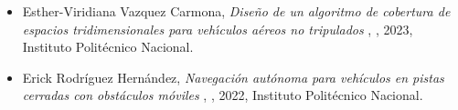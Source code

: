 \begin{itemize} 
\item Esther-Viridiana Vazquez Carmona, \textit{ Diseño de un algoritmo de cobertura de espacios tridimensionales para vehı́culos aéreos no tripulados }, \href{ https://jivg.org/wp-content/uploads/2023/02/2023_phd_Vazquez.pdf }{\faFilePdfO}, 2023, Instituto Politécnico Nacional. 
\item Erick Rodríguez Hernández, \textit{ Navegación autónoma para vehículos en pistas cerradas con obstáculos móviles }, \href{ https://jivg.org/wp-content/uploads/2022/08/2022_phd_Rodriguez.pdf }{\faFilePdfO}, 2022, Instituto Politécnico Nacional. 
\end{itemize} 
